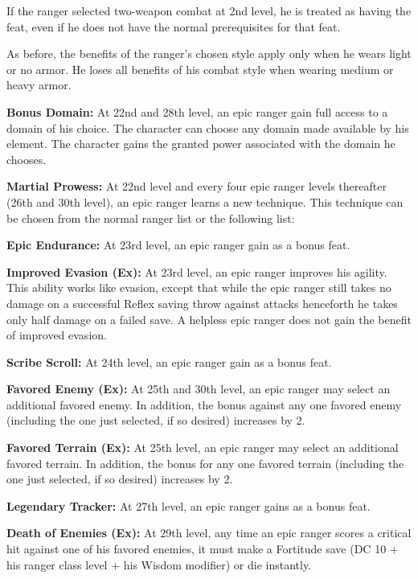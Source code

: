 If the ranger selected two-weapon combat at 2nd level, he is treated as having the  feat, even if he does not have the normal prerequisites for that feat.

As before, the benefits of the ranger's chosen style apply only when he wears light or no armor. He loses all benefits of his combat style when wearing medium or heavy armor.

\textbf{Bonus Domain:} At 22nd and 28th level, an epic ranger gain full access to a domain of his choice. The character can choose any domain made available by his element. The character gains the granted power associated with the domain he chooses.

\textbf{Martial Prowess:} At 22nd level and every four epic ranger levels thereafter (26th and 30th level), an epic ranger learns a new technique. This technique can be chosen from the normal ranger list or the following list:



\textbf{Epic Endurance:} At 23rd level, an epic ranger gain  as a bonus feat.

\textbf{Improved Evasion (Ex):} At 23rd level, an epic ranger improves his agility. This ability works like evasion, except that while the epic ranger still takes no damage on a successful Reflex saving throw against attacks henceforth he takes only half damage on a failed save. A helpless epic ranger does not gain the benefit of improved evasion.

\textbf{Scribe Scroll:} At 24th level, an epic ranger gain  as a bonus feat.

\textbf{Favored Enemy (Ex):} At 25th and 30th level, an epic ranger may select an additional favored enemy. In addition, the bonus against any one favored enemy (including the one just selected, if so desired) increases by 2.

\textbf{Favored Terrain (Ex):} At 25th level, an epic ranger may select an additional favored terrain. In addition, the bonus for any one favored terrain (including the one just selected, if so desired) increases by 2.

\textbf{Legendary Tracker:} At 27th level, an epic ranger gains  as a bonus feat.

\textbf{Death of Enemies (Ex):} At 29th level, any time an epic ranger scores a critical hit against one of his favored enemies, it must make a Fortitude save (DC 10 + \onehalf his ranger class level + his Wisdom modifier) or die instantly.
